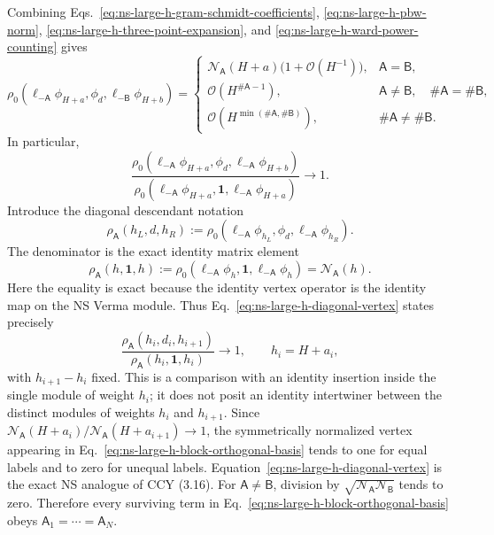 \documentclass[11pt]{article}
\newcommand{\order}{\mathcal O}
\begin{document}
Combining Eqs.~\eqref{eq:ns-large-h-gram-schmidt-coefficients},
\eqref{eq:ns-large-h-pbw-norm},
\eqref{eq:ns-large-h-three-point-expansion}, and
\eqref{eq:ns-large-h-ward-power-counting} gives
\begin{equation}
 \rho_0\!\left(
 \boldsymbol\ell_{-\mathsf A}\phi_{H+a},
 \phi_d,
 \boldsymbol\ell_{-\mathsf B}\phi_{H+b}
 \right)
 =
 \begin{cases}
 \mathcal N_{\mathsf A}(H+a)
 \bigl(1+\order(H^{-1})\bigr),
 &\mathsf A=\mathsf B,\\[2pt]
 \order(H^{\#\mathsf A-1}),
 &\mathsf A\neq\mathsf B,\quad
  \#\mathsf A=\#\mathsf B,\\[2pt]
 \order\!\left(H^{\min(\#\mathsf A,\#\mathsf B)}\right),
 &\#\mathsf A\neq\#\mathsf B .
 \end{cases}
 \label{eq:ns-large-h-orthogonal-vertex-power-counting}
\end{equation}
In particular,
\begin{equation}
 \frac{
 \rho_0\!\left(
 \boldsymbol\ell_{-\mathsf A}\phi_{H+a},
 \phi_d,
 \boldsymbol\ell_{-\mathsf A}\phi_{H+b}
 \right)}
 {
 \rho_0\!\left(
 \boldsymbol\ell_{-\mathsf A}\phi_{H+a},
 \mathbf 1,
 \boldsymbol\ell_{-\mathsf A}\phi_{H+a}
 \right)}
 \longrightarrow1 .
 \label{eq:ns-large-h-diagonal-vertex}
\end{equation}
Introduce the diagonal descendant notation
\begin{equation}
 \rho_{\mathsf A}(h_L,d,h_R)
 :=
 \rho_0\!\left(
 \boldsymbol\ell_{-\mathsf A}\phi_{h_L},
 \phi_d,
 \boldsymbol\ell_{-\mathsf A}\phi_{h_R}
 \right).
 \label{eq:ns-diagonal-descendant-vertex}
\end{equation}
The denominator is the exact identity matrix element
\begin{equation}
 \rho_{\mathsf A}(h,\mathbf 1,h)
 :=
 \rho_0\!\left(
 \boldsymbol\ell_{-\mathsf A}\phi_h,
 \mathbf 1,
 \boldsymbol\ell_{-\mathsf A}\phi_h
 \right)
 =\mathcal N_{\mathsf A}(h).
 \label{eq:ns-identity-matrix-element}
\end{equation}
Here the equality is exact because the identity vertex operator is the
identity map on the NS Verma module.
Thus Eq.~\eqref{eq:ns-large-h-diagonal-vertex} states precisely
\begin{equation}
 \frac{
 \rho_{\mathsf A}(h_i,d_i,h_{i+1})}
 {\rho_{\mathsf A}(h_i,\mathbf 1,h_i)}
 \longrightarrow1,
 \qquad h_i=H+a_i,
 \label{eq:ns-vertex-to-identity-comparison}
\end{equation}
with \(h_{i+1}-h_i\) fixed.  This is a comparison with an identity
insertion inside the single module of weight \(h_i\); it does not posit an
identity intertwiner between the distinct modules of weights \(h_i\) and
\(h_{i+1}\).  Since
\(\mathcal N_{\mathsf A}(H+a_i)/
\mathcal N_{\mathsf A}(H+a_{i+1})\to1\), the symmetrically normalized
vertex appearing in Eq.~\eqref{eq:ns-large-h-block-orthogonal-basis}
tends to one for equal labels and to zero for unequal labels.
Equation~\eqref{eq:ns-large-h-diagonal-vertex} is the exact NS analogue of
CCY (3.16).  For \(\mathsf A\neq\mathsf B\), division by
\(\sqrt{\mathcal N_{\mathsf A}\mathcal N_{\mathsf B}}\) tends to zero.
Therefore every surviving term in
Eq.~\eqref{eq:ns-large-h-block-orthogonal-basis} obeys
\(\mathsf A_1=\cdots=\mathsf A_N\).
\end{document}
